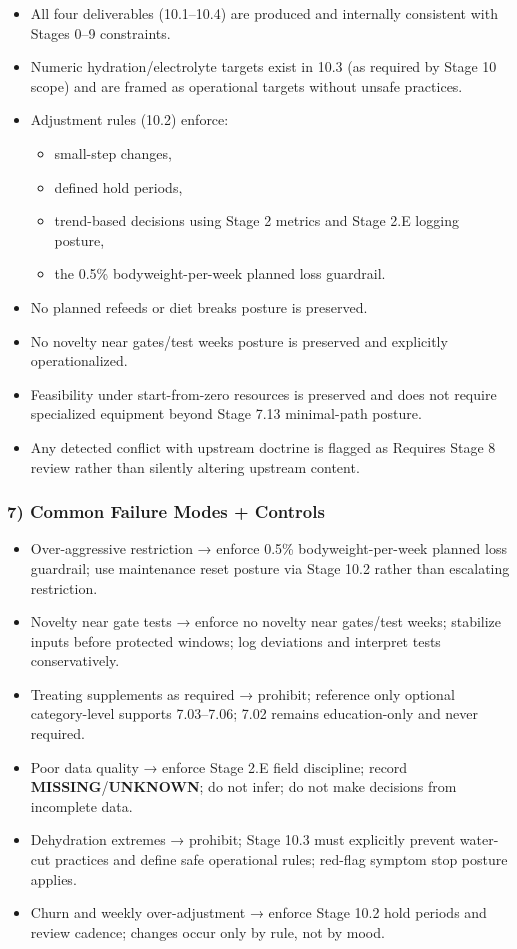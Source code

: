 \documentclass[10pt]{article}
\begin{document}
\begin{itemize}
\item All four deliverables (10.1–10.4) are produced and internally consistent with Stages 0–9 constraints.
\item Numeric hydration/electrolyte targets exist in 10.3 (as required by Stage 10 scope) and are framed as operational targets without unsafe practices.
\item Adjustment rules (10.2) enforce:
  \begin{itemize}
  \item small-step changes,
  \item defined hold periods,
  \item trend-based decisions using Stage 2 metrics and Stage 2.E logging posture,
  \item the 0.5\% bodyweight-per-week planned loss guardrail.
  \end{itemize}
\item No planned refeeds or diet breaks posture is preserved.
\item No novelty near gates/test weeks posture is preserved and explicitly operationalized.
\item Feasibility under start-from-zero resources is preserved and does not require specialized equipment beyond Stage 7.13 minimal-path posture.
\item Any detected conflict with upstream doctrine is flagged as Requires Stage 8 review rather than silently altering upstream content.
\end{itemize}

\subsubsection*{7) Common Failure Modes + Controls}

\begin{itemize}
\item Over-aggressive restriction → enforce 0.5\% bodyweight-per-week planned loss guardrail; use maintenance reset posture via Stage 10.2 rather than escalating restriction.
\item Novelty near gate tests → enforce no novelty near gates/test weeks; stabilize inputs before protected windows; log deviations and interpret tests conservatively.
\item Treating supplements as required → prohibit; reference only optional category-level supports 7.03–7.06; 7.02 remains education-only and never required.
\item Poor data quality → enforce Stage 2.E field discipline; record \textbf{MISSING}/\textbf{UNKNOWN}; do not infer; do not make decisions from incomplete data.
\item Dehydration extremes → prohibit; Stage 10.3 must explicitly prevent water-cut practices and define safe operational rules; red-flag symptom stop posture applies.
\item Churn and weekly over-adjustment → enforce Stage 10.2 hold periods and review cadence; changes occur only by rule, not by mood.
\end{itemize}
\end{document}
